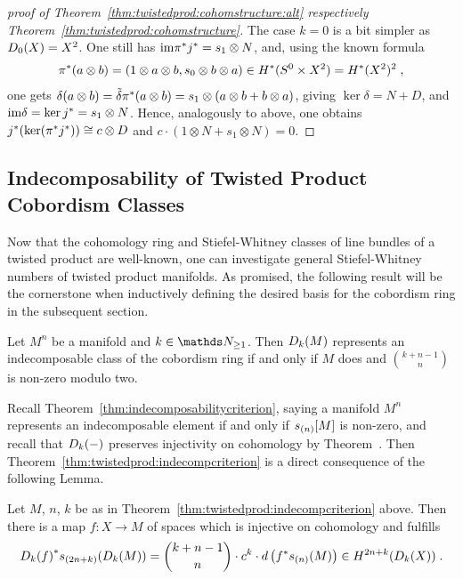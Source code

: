 \begin{proof}[proof of
  Theorem~\ref{thm:twistedprod:cohomstructure:alt}
  respectively Theorem~\ref{thm:twistedprod:cohomstructure}]
  The case $k=0$ is a bit simpler as
  $D_{0}({X})=X^2$. One still has
  $\mathrm{im}{\pi}^*{j}^*=s_1\otimes N$, and, using the known formula
  \begin{gather*}
    {\pi}^*(a\otimes b)=(1\otimes a\otimes b, s_0\otimes b\otimes a)
    \in H^*(S^0\times X^2)=H^*(X^2)^2
    \;,
  \end{gather*}
  one gets
  $\delta(a\otimes b)
  = \tilde\delta{\pi}^*(a\otimes b)
  = s_1\otimes(a\otimes b + b\otimes a)$, giving
  $\ker\delta=N+D$, and $\mathrm{im}\delta = \ker{j}^* = s_1\otimes N$.
  Hence, analogously to above, one obtains
  ${j}^* (\ker({\pi}^*{j}^*)) \cong c\otimes D$ and
  $c\cdot (1\otimes N + s_1\otimes N) = 0$.
\end{proof}


\subsection{Indecomposability of Twisted Product Cobordism Classes}
\label{sec:twistedprod:indecompcriterion}
Now that the cohomology ring and Stiefel-Whitney classes of line
bundles of a twisted product are well-known, one can investigate
general Stiefel-Whitney numbers of twisted product manifolds.
As promised, the following result will be the cornerstone when inductively
defining the desired basis for the cobordism ring in the subsequent section.
\begin{Thm}\label{thm:twistedprod:indecompcriterion}
  Let $M^n$ be a manifold and $k\in\Nat_{\geq1}$.
  Then $D_{k}({M})$ represents an indecomposable class of the
  cobordism ring if and only if $M$ does and $\binom{k+n-1}{n}$ is
  non-zero modulo two.
\end{Thm}
Recall Theorem~\ref{thm:indecomposabilitycriterion}, saying
a manifold $M^n$ represents an indecomposable element if and only if
$s_{(n)}[M]$ is non-zero,
and recall that $D_{k}({-})$ preserves injectivity on
cohomology by
Theorem~.
Then Theorem~\ref{thm:twistedprod:indecompcriterion} is a
direct consequence of the following Lemma.
\begin{Lem}\label{lem:twistedprod:indecompcriterion}
  Let $M$, $n$, $k$ be as in
  Theorem~\ref{thm:twistedprod:indecompcriterion} above.
  Then there is a map $f\colon X\to M$ of spaces which is injective on
  cohomology and fulfills
  \begin{gather*}
    {D_{k}({f})}^* s_{(2n+k)}(D_{k}({M}))
    = \binom{k+n-1}{n} \cdot c^k
    \cdot d\left( {f}^* s_{(n)}(M) \right)
    \in H^{2n+k}(D_{k}({X}))
    \;.
  \end{gather*}
\end{Lem}
